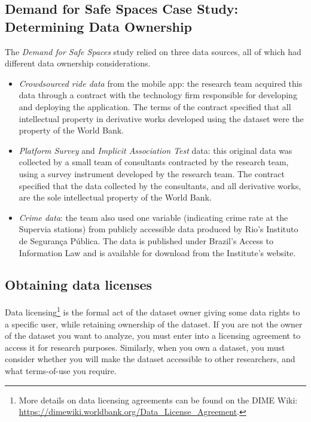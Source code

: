 \documentclass[
]{book}
\providecommand{\tightlist}{%
  \setlength{\itemsep}{0pt}\setlength{\parskip}{0pt}}
\begin{document}
\begin{ex}
\hypertarget{demand-for-safe-spaces-case-study-determining-data-ownership}{%
\subsection{Demand for Safe Spaces Case Study: Determining Data Ownership}\label{demand-for-safe-spaces-case-study-determining-data-ownership}}

The \emph{Demand for Safe Spaces} study relied on three data sources, all of which had different data ownership considerations.

\begin{itemize}
\tightlist
\item
  \emph{Crowdsourced ride data} from the mobile app: the research team acquired this data through a contract with the technology firm responsible for developing and deploying the application. The terms of the contract specified that all intellectual property in derivative works developed using the dataset were the property of the World Bank.
\item
  \emph{Platform Survey} and \emph{Implicit Association Test} data: this original data was collected by a small team of consultants contracted by the research team, using a survey instrument developed by the research team. The contract specified that the data collected by the consultants, and all derivative works, are the sole intellectual property of the World Bank.
\item
  \emph{Crime data}: the team also used one variable (indicating crime rate at the Supervia stations) from publicly accessible data produced by Rio's Instituto de Segurança Pública. The data is published under Brazil's Access to Information Law and is available for download from the Institute's website.
\end{itemize}
\end{ex}

\hypertarget{obtaining-data-licenses}{%
\subsection*{Obtaining data licenses}\label{obtaining-data-licenses}}

Data licensing\footnote{More details on data licensing agreements can be found on the DIME Wiki:
  \url{https://dimewiki.worldbank.org/Data_License_Agreement}.}
is the formal act of the dataset owner
giving some data rights to a specific user,
while retaining ownership of the dataset.
If you are not the owner of the dataset you want to analyze,
you must enter into a licensing agreement to access it for research purposes.
Similarly, when you own a dataset,
you must consider whether you will make the dataset accessible to other researchers,
and what terms-of-use you require.
\end{document}
